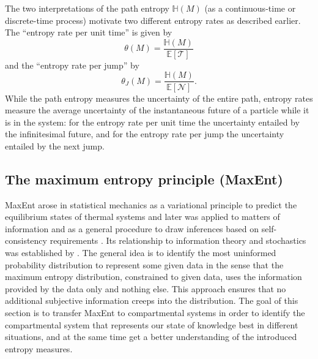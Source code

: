\documentclass[smallextended]{svjour3}
\newcommand{\E}{\mathbb{E}}
\newcommand{\TT}{\mathcal{T}}
\renewcommand{\H}{\mathbb{H}}
\renewcommand{\emph}[1]{``#1''}
\begin{document}
The two interpretations of the path entropy $\H(M)$ (as a continuous-time or discrete-time process) motivate two different entropy rates as described earlier.
The \emph{entropy rate per unit time} is given by
\begin{equation}
  \theta(M) = \frac{\H(M)}{\E\left[\TT\right]}
\end{equation}
and the \emph{entropy rate per jump} by
\begin{equation}
  \theta_J(M) = \frac{\H(M)}{\E\left[\mathcal{N}\right]}.
\end{equation}
While the path entropy measures the uncertainty of the entire path, entropy rates measure the average uncertainty of the instantaneous future of a particle while it is in the system: for the entropy rate per unit time the uncertainty entailed by the infinitesimal future, and for the entropy rate per jump the uncertainty entailed by the next jump.


\subsection{The maximum entropy principle (MaxEnt)}
MaxEnt arose in statistical mechanics as a variational principle to predict the equilibrium states of thermal systems and later was applied to matters of information and as a general procedure to draw inferences based on self-consistency requirements \citep{Presse2013RMP}.
Its relationship to information theory and stochastics was established by \citet{Jaynes1957PR1, Jaynes1957PR2}.
The general idea is to identify the most uninformed probability distribution to represent some given data in the sense that the maximum entropy distribution, constrained to given data, uses the information provided by the data only and nothing else.
This approach ensures that no additional subjective information creeps into the distribution.
The goal of this section is to transfer MaxEnt to compartmental systems in order to identify the compartmental system that represents our state of knowledge best in different situations, and at the same time get a better understanding of the introduced entropy measures.
\end{document}
